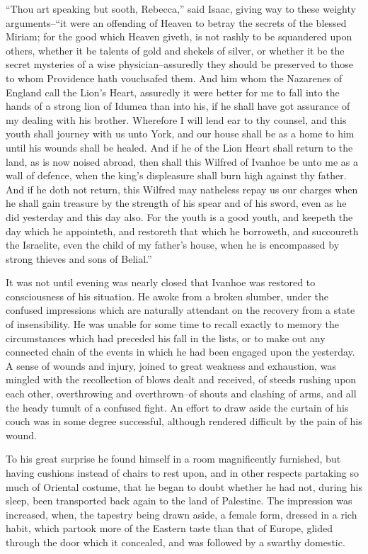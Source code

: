 ``Thou art speaking but sooth, Rebecca,'' said Isaac, giving way to
these weighty arguments--``it were an offending of Heaven to betray the
secrets of the blessed Miriam; for the good which Heaven giveth, is not
rashly to be squandered upon others, whether it be talents of gold and
shekels of silver, or whether it be the secret mysteries of a wise
physician--assuredly they should be preserved to those to whom
Providence hath vouchsafed them. And him whom the Nazarenes of England
call the Lion's Heart, assuredly it were better for me to fall into the
hands of a strong lion of Idumea than into his, if he shall have got
assurance of my dealing with his brother. Wherefore I will lend ear to
thy counsel, and this youth shall journey with us unto York, and our
house shall be as a home to him until his wounds shall be healed. And if
he of the Lion Heart shall return to the land, as is now noised abroad,
then shall this Wilfred of Ivanhoe be unto me as a wall of defence, when
the king's displeasure shall burn high against thy father. And if he
doth not return, this Wilfred may natheless repay us our charges when he
shall gain treasure by the strength of his spear and of his sword, even
as he did yesterday and this day also. For the youth is a good youth,
and keepeth the day which he appointeth, and restoreth that which he
borroweth, and succoureth the Israelite, even the child of my father's
house, when he is encompassed by strong thieves and sons of Belial.''

It was not until evening was nearly closed that Ivanhoe was restored to
consciousness of his situation. He awoke from a broken slumber, under
the confused impressions which are naturally attendant on the recovery
from a state of insensibility. He was unable for some time to recall
exactly to memory the circumstances which had preceded his fall in the
lists, or to make out any connected chain of the events in which he had
been engaged upon the yesterday. A sense of wounds and injury, joined to
great weakness and exhaustion, was mingled with the recollection of
blows dealt and received, of steeds rushing upon each other,
overthrowing and overthrown--of shouts and clashing of arms, and all the
heady tumult of a confused fight. An effort to draw aside the curtain of
his couch was in some degree successful, although rendered difficult by
the pain of his wound.

To his great surprise he found himself in a room magnificently
furnished, but having cushions instead of chairs to rest upon, and in
other respects partaking so much of Oriental costume, that he began to
doubt whether he had not, during his sleep, been transported back again
to the land of Palestine. The impression was increased, when, the
tapestry being drawn aside, a female form, dressed in a rich habit,
which partook more of the Eastern taste than that of Europe, glided
through the door which it concealed, and was followed by a swarthy
domestic.


